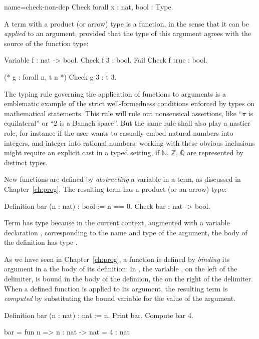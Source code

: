 \begin{coq}{name=check-non-dep}{}
Check forall x : nat, bool : Type.
\end{coq}

A term with a product (or arrow) type is a function, in the sense that
it can be \emph{applied} to an argument, provided that the type of
this argument agrees with the source of the function type:

\begin{coq}{}{}
Variable f : nat -> bool.
Check f 3 : bool.
Fail Check f true : bool.

(* g : forall n, t n *)
Check g 3 : t 3.
\end{coq}

The typing rule governing the application of functions to arguments is
a emblematic example of the strict well-formedness conditions enforced
by types on mathematical statements. This rule will rule out
nonsensical assertions, like ``$\pi$ is equilateral'' or ``2 is a
Banach space''. But the same rule shall also play a nastier role, for
instance if the user wants to casually embed natural numbers into
integers, and integer into rational numbers: working with these
obvious inclusions might require an explicit cast in a typed setting,
if $\mathbb{N}$, $\mathbb{Z}$, $\mathbb{Q}$ are represented by
distinct types.


New functions are defined by \emph{abstracting} a variable in a term,
as discussed in Chapter~\ref{ch:prog}. The resulting term has a
product (or an arrow) type:

\begin{coq}{}{}
Definition bar (n : nat) : bool := 
  n == 0.
Check bar : nat -> bool.
\end{coq}

Term  has type  because in the current context,
augmented with a variable declaration , corresponding to
the name and type of the argument, the body  of the definition
 has type .

As we have seen in Chapter~\ref{ch:prog}, a function is defined by
\emph{binding} its argument in a the body of its definition: in
, the variable , on the left of the \C{:=} delimiter, is
bound in the body of the definiion, the  on the right of the \C{:=}
delimiter. When a defined function is applied to its argument, the
resulting term is \emph{computed} by substituting the bound variable
for the value of the argument.

\begin{coq-left}{}{}
Definition bar (n : nat) : nat := n.
Print bar.
Compute bar 4.
\end{coq-left}
\begin{coqout-right}
bar = fun n => n
    : nat -> nat 
= 4
: nat
\end{coqout-right}


